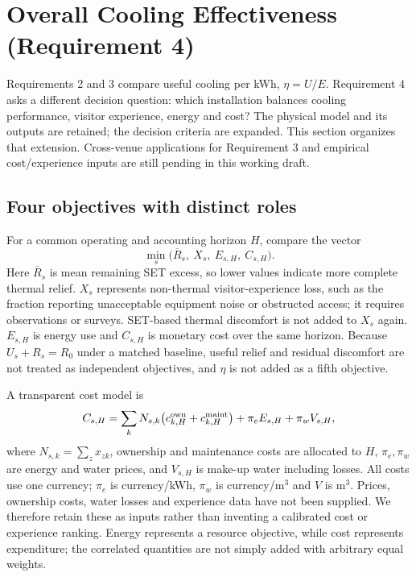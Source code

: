\section{Overall Cooling Effectiveness (Requirement 4)}
\label{sec:effectiveness}

Requirements 2 and 3 compare useful cooling per kWh, $\eta=U/E$. Requirement 4 asks a different decision question: which installation balances cooling performance, visitor experience, energy and cost? The physical model and its outputs are retained; the decision criteria are expanded. This section organizes that extension. Cross-venue applications for Requirement 3 and empirical cost/experience inputs are still pending in this working draft.

\subsection{Four objectives with distinct roles}

For a common operating and accounting horizon $H$, compare the vector
\begin{equation}
 \min_s\big(\overline R_s,\ X_s,\ E_{s,H},\ C_{s,H}\big).
\label{eq:effectiveness-vector}
\end{equation}
Here $\overline R_s$ is mean remaining SET excess, so lower values indicate more complete thermal relief. $X_s$ represents non-thermal visitor-experience loss, such as the fraction reporting unacceptable equipment noise or obstructed access; it requires observations or surveys. SET-based thermal discomfort is not added to $X_s$ again. $E_{s,H}$ is energy use and $C_{s,H}$ is monetary cost over the same horizon. Because $U_s+R_s=R_0$ under a matched baseline, useful relief and residual discomfort are not treated as independent objectives, and $\eta$ is not added as a fifth objective.

A transparent cost model is
\begin{equation}
 C_{s,H}=\sum_k N_{s,k}\big(c_{k,H}^{\rm own}+c_{k,H}^{\rm maint}\big)
 +\pi_e E_{s,H}+\pi_w V_{s,H},
\label{eq:total-cost}
\end{equation}
where $N_{s,k}=\sum_zx_{zk}$, ownership and maintenance costs are allocated to $H$, $\pi_e,\pi_w$ are energy and water prices, and $V_{s,H}$ is make-up water including losses. All costs use one currency; $\pi_e$ is currency/kWh, $\pi_w$ is currency/m$^3$ and $V$ is m$^3$. Prices, ownership costs, water losses and experience data have not been supplied. We therefore retain these as inputs rather than inventing a calibrated cost or experience ranking. Energy represents a resource objective, while cost represents expenditure; the correlated quantities are not simply added with arbitrary equal weights.

